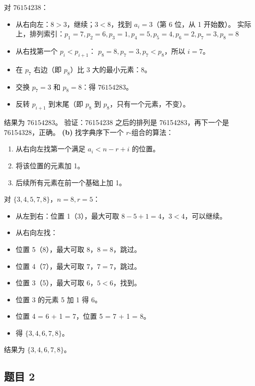 \documentclass[10pt,a4paper,openany]{ctexbook}
\theoremstyle{definition}
\theoremstyle{remark}
\begin{document}
对 $76154238$：
\begin{itemize}
\item 从右向左：$8 > 3$，继续；$3 < 8$，找到 $a_i = 3$（第 6 位，从 1 开始数）。
实际上，排列索引：$p_1=7, p_2=6, p_3=1, p_4=5, p_5=4, p_6=2, p_7=3, p_8=8$

\item 从右找第一个 $p_i < p_{i+1}$：
$p_8=8, p_7=3, p_7 < p_8$，所以 $i=7$。

\item 在 $p_7$ 右边（即 $p_8$）比 3 大的最小元素：$8$。
\item 交换 $p_7=3$ 和 $p_8=8$：得 $76154283$。
\item 反转 $p_{i+1}$ 到末尾（即 $p_8$ 到 $p_8$，只有一个元素，不变）。

\end{itemize}

结果为 \textbf{$76154283$}。
验证：76154238 之后的排列是 76154283，再下一个是 76154328，正确。
\textbf{(b)} 找字典序下一个 $r$-组合的算法：
\begin{enumerate}
\item 从右向左找第一个满足 $a_i < n - r + i$ 的位置。
\item 将该位置的元素加 1。
\item 后续所有元素在前一个基础上加 1。

\end{enumerate}

对 $\{3,4,5,7,8\}$，$n=8, r=5$：
\begin{itemize}
\item 从左到右：位置 1（3），最大可取 $8-5+1=4$，$3 < 4$，可以继续。
\item 从右向左找：
\item 位置 5（8），最大可取 $8$，$8 = 8$，跳过。
\item 位置 4（7），最大可取 $7$，$7 = 7$，跳过。
\item 位置 3（5），最大可取 $6$，$5 < 6$，找到。
\item 位置 3 的元素 5 加 1 得 6。
\item 位置 4 = 6 + 1 = 7，位置 5 = 7 + 1 = 8。
\item 得 $\{3,4,6,7,8\}$。

\end{itemize}

结果为 \textbf{$\{3,4,6,7,8\}$}。
\vspace{-2pt}

\subsection{题目 2}
\end{document}
